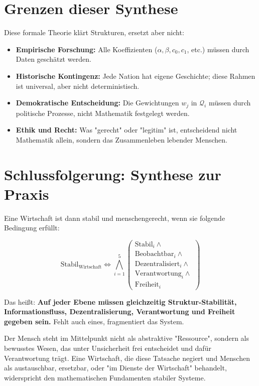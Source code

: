 \documentclass[a4paper, 12pt, twoside, openright]{report}
\theoremstyle{definition}
\theoremstyle{definition}
\begin{document}
\section{Grenzen dieser Synthese}

Diese formale Theorie klärt Strukturen, ersetzt aber nicht:
\begin{itemize}
\item \textbf{Empirische Forschung:} Alle Koeffizienten ($\alpha, \beta, c_0, c_1$, etc.) müssen durch Daten geschätzt werden.
\item \textbf{Historische Kontingenz:} Jede Nation hat eigene Geschichte; diese Rahmen ist universal, aber nicht deterministisch.
\item \textbf{Demokratische Entscheidung:} Die Gewichtungen $w_j$ in $\mathcal{Q}_i$ müssen durch politische Prozesse, nicht Mathematik festgelegt werden.
\item \textbf{Ethik und Recht:} Was "gerecht" oder "legitim" ist, entscheidend nicht Mathematik allein, sondern das Zusammenleben lebender Menschen.
\end{itemize}

\section{Schlussfolgerung: Synthese zur Praxis}

Eine Wirtschaft ist dann stabil und menschengerecht, wenn sie folgende Bedingung erfüllt:

\begin{equation}
\boxed{
\text{Stabil}_{\text{Wirtschaft}} \Leftrightarrow \bigwedge_{i=1}^{5} \left(
\begin{array}{c}
\text{Stabil}_i \land \\
\text{Beobachtbar}_i \land \\
\text{Dezentralisiert}_i \land \\
\text{Verantwortung}_i \land \\
\text{Freiheit}_i
\end{array}
\right)
}
\end{equation}

Das heißt: \textbf{Auf jeder Ebene müssen gleichzeitig Struktur-Stabilität, Informationsfluss, Dezentralisierung, Verantwortung und Freiheit gegeben sein.} Fehlt auch eines, fragmentiert das System.

Der Mensch steht im Mittelpunkt nicht als abstraktive "Ressource", sondern als bewusstes Wesen, das unter Unsicherheit frei entscheidet und dafür Verantwortung trägt. Eine Wirtschaft, die diese Tatsache negiert und Menschen als austauschbar, ersetzbar, oder "im Dienste der Wirtschaft" behandelt, widerspricht den mathematischen Fundamenten stabiler Systeme.
\end{document}
